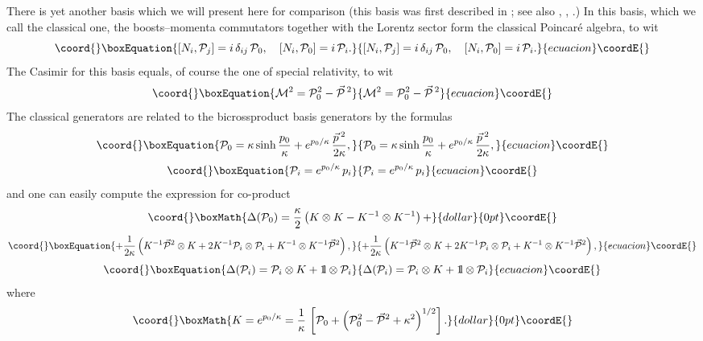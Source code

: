 \documentclass [prd,twocolumn,nofootinbib,showpacs]  {revtex4}
\def\bbbone{{\mathchoice {\rm 1\mskip-4mu l} {\rm 1\mskip-4mu l}
{\rm 1\mskip-4.5mu l} {\rm 1\mskip-5mu l}}}
\begin{document}
There is yet another basis which we will present here for
comparison (this basis was first described in \cite{maslanka}; see also
\cite{kolumaso}, \cite{lukclas}, \cite{luruza}.) In this basis,
which we call the classical one, the boosts--momenta commutators
together with the Lorentz sector form the classical Poincar\'e
algebra, to wit
\begin{equation}\coord{}\boxEquation{\label{17}
   \left[N_{i}, {\cal P}_{j}\right] = i\, \delta_{ij}\, {\cal P}_0  ,\quad \left[N_{i}, {\cal P}_{0}\right] = i\,
   {\cal P}_i.
}{\left[N_{i}, {\cal P}_{j}\right] = i\, \delta_{ij}\, {\cal P}_0  ,\quad \left[N_{i}, {\cal P}_{0}\right] = i\,
   {\cal P}_i.
}{ecuacion}\coordE{}\end{equation}
The Casimir for this basis equals, of course the one of special relativity, to wit
\begin{equation}\coord{}\boxEquation{\label{17a}
 {\cal M}^2 = {\cal P}_0^2 - \vec{\cal P}\,{}^2
}{{\cal M}^2 = {\cal P}_0^2 - \vec{\cal P}\,{}^2
}{ecuacion}\coordE{}\end{equation}
The classical generators \coordHE{} are related to the bicrossproduct basis generators by the formulas
\begin{equation}\coord{}\boxEquation{\label{18}
 {\cal P}_{0} = \kappa \sinh\frac{p_0}\kappa + e^{p_0/\kappa}\, \frac{\vec{p}\, {}^2}{2\kappa},
}{{\cal P}_{0} = \kappa \sinh\frac{p_0}\kappa + e^{p_0/\kappa}\, \frac{\vec{p}\, {}^2}{2\kappa},
}{ecuacion}\coordE{}\end{equation}
\begin{equation}\coord{}\boxEquation{\label{19}
 {\cal P}_{i}= e^{p_0/\kappa} \, p_i
}{{\cal P}_{i}= e^{p_0/\kappa} \, p_i
}{ecuacion}\coordE{}\end{equation}
and one can easily compute the expression for co-product
$$\coord{}\boxMath{
  \Delta({\cal P}_{0}) = \frac\kappa2\left(K \otimes K - K^{-1}\otimes K^{-1}\right)+}{dollar}{0pt}\coordE{}$$
  \begin{equation}\coord{}\boxEquation{\label{20}
  + \frac1{2\kappa}\left(K^{-1} \vec{{\cal P}}{}^2 \otimes K +
  2K^{-1} {\cal P}_i \otimes {\cal P}_i + K^{-1}\otimes K^{-1}\vec{{\cal P}}{}^2\right),
}{+ \frac1{2\kappa}\left(K^{-1} \vec{{\cal P}}{}^2 \otimes K +
  2K^{-1} {\cal P}_i \otimes {\cal P}_i + K^{-1}\otimes K^{-1}\vec{{\cal P}}{}^2\right),
}{ecuacion}\coordE{}\end{equation}
\begin{equation}\coord{}\boxEquation{\label{20a}
 \Delta({\cal P}_{i}) ={\cal P}_{i}\otimes K + \bbbone\otimes {\cal P}_{i}
}{\Delta({\cal P}_{i}) ={\cal P}_{i}\otimes K + \bbbone\otimes {\cal P}_{i}
}{ecuacion}\coordE{}\end{equation}
where
$$\coord{}\boxMath{
K = e^{p_0/\kappa} = \frac1\kappa\, \left[ {\cal P}_{0} + \left(
{\cal P}_{0}^2 - \vec{{\cal P}}{}^2  +
\kappa^2\right)^{1/2}\right].
}{dollar}{0pt}\coordE{}$$
\end{document}
